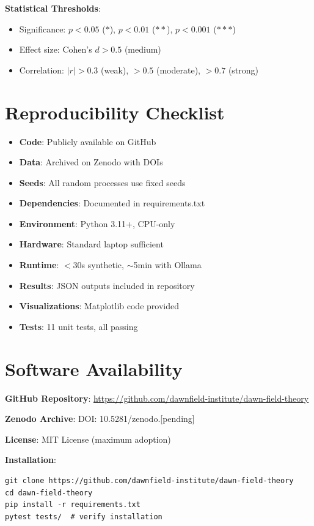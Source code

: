 \documentclass[11pt,a4paper]{article}
\begin{document}
\textbf{Statistical Thresholds}:
\begin{itemize}
    \item Significance: $p < 0.05$ ($*$), $p < 0.01$ ($**$), $p < 0.001$ ($***$)
    \item Effect size: Cohen's $d > 0.5$ (medium)
    \item Correlation: $|r| > 0.3$ (weak), $> 0.5$ (moderate), $> 0.7$ (strong)
\end{itemize}

\section{Reproducibility Checklist}

\begin{itemize}
    \item[$\checkmark$] \textbf{Code}: Publicly available on GitHub
    \item[$\checkmark$] \textbf{Data}: Archived on Zenodo with DOIs
    \item[$\checkmark$] \textbf{Seeds}: All random processes use fixed seeds
    \item[$\checkmark$] \textbf{Dependencies}: Documented in requirements.txt
    \item[$\checkmark$] \textbf{Environment}: Python 3.11+, CPU-only
    \item[$\checkmark$] \textbf{Hardware}: Standard laptop sufficient
    \item[$\checkmark$] \textbf{Runtime}: $<$30s synthetic, $\sim$5min with Ollama
    \item[$\checkmark$] \textbf{Results}: JSON outputs included in repository
    \item[$\checkmark$] \textbf{Visualizations}: Matplotlib code provided
    \item[$\checkmark$] \textbf{Tests}: 11 unit tests, all passing
\end{itemize}

\section{Software Availability}

\textbf{GitHub Repository}: \url{https://github.com/dawnfield-institute/dawn-field-theory}

\textbf{Zenodo Archive}: DOI: 10.5281/zenodo.[pending]

\textbf{License}: MIT License (maximum adoption)

\textbf{Installation}:
\begin{verbatim}
git clone https://github.com/dawnfield-institute/dawn-field-theory
cd dawn-field-theory
pip install -r requirements.txt
pytest tests/  # verify installation
\end{verbatim}
\end{document}
